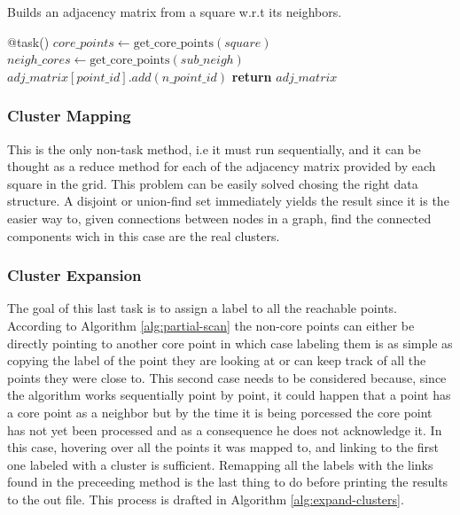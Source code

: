 \documentclass[10pt,journal,compsoc]{IEEEtran}
\let\MYoriglatexcaption\caption
\renewcommand{\caption}[2][\relax]{\MYoriglatexcaption[#2]{#2}}
\begin{document}
\begin{algorithm}
  \caption{Builds an adjacency matrix from a square w.r.t its neighbors.\label{alg:sync-clusters}}
  \begin{algorithmic}[1]
    \State @task()
        \State $core\_points \gets \text{get\_core\_points}(square)$
            \State $neigh\_cores \gets \text{get\_core\_points}(sub\_neigh)$
                \State $adj\_matrix[point\_id].add(n\_point\_id)$
            \EndIf
        \EndFor
        \State \textbf{return} $adj\_matrix$
    \EndFunction
  \end{algorithmic}
\end{algorithm}

\subsubsection{Cluster Mapping} \label{subsec:cluster-mapping}
This is the only non-task method, i.e it must run sequentially, and it can be thought as a reduce method for each of the adjacency matrix provided by each square in the grid. This problem can be easily solved chosing the right data structure. A disjoint or union-find set immediately yields the result since it is the easier way to, given connections between nodes in a graph, find the connected components wich in this case are the real clusters.

\subsubsection{Cluster Expansion} \label{cluster_exp}
The goal of this last task is to assign a label to all the reachable points. According to Algorithm \ref{alg:partial-scan} the non-core points can either be directly pointing to another core point in which case labeling them is as simple as copying the label of the point they are looking at  or can keep track of all the points they were close to. This second case needs to be considered because, since the algorithm works sequentially point by point, it could happen that a point has a core point as a neighbor but by the time it is being porcessed the core point has not yet been processed and as a consequence he does not acknowledge it. In this case, hovering over all the points it was mapped to, and linking to the first one labeled with a cluster is sufficient. Remapping all the labels with the links found in the preceeding method is the last thing to do before printing the results to the out file. This process is drafted in Algorithm \ref{alg:expand-clusters}.
\end{document}
